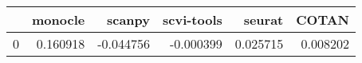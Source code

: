 \begin{tabular}{lrrrrr}
\toprule
 & monocle & scanpy & scvi-tools & seurat & COTAN \\
\midrule
0 & 0.160918 & -0.044756 & -0.000399 & 0.025715 & 0.008202 \\
\bottomrule
\end{tabular}
